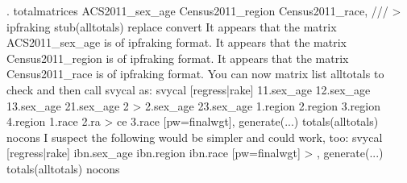 . totalmatrices ACS2011_sex_age Census2011_region Census2011_race, ///
>         ipfraking stub(alltotals) replace convert
It appears that the matrix ACS2011_sex_age is of ipfraking format.
It appears that the matrix Census2011_region is of ipfraking format.
It appears that the matrix Census2011_race is of ipfraking format.
You can now matrix list alltotals to check and then call svycal as:
   svycal [regress|rake] 11.sex_age 12.sex_age 13.sex_age 21.sex_age 2
> 2.sex_age 23.sex_age 1.region 2.region 3.region 4.region 1.race 2.ra
> ce 3.race [pw=finalwgt], generate(...) totals(alltotals) nocons
I suspect the following would be simpler and could work, too:
   svycal [regress|rake] ibn.sex_age ibn.region ibn.race [pw=finalwgt]
> , generate(...) totals(alltotals) nocons
{\smallskip}
